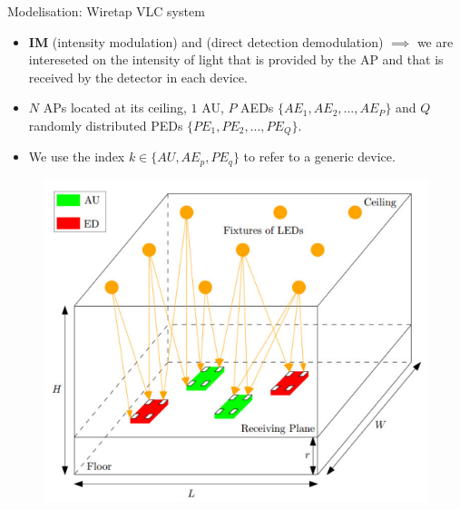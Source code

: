 \documentclass[aspectratio=169,xcolor=dvipsnames]{beamer}
\begin{document}
	\begin{frame}{Modelisation: Wiretap VLC system}
		\begin{itemize}
			\item \textbf{IM} (intensity modulation) and  (direct detection demodulation) $\implies$ we are intereseted on the intensity of light that is provided by the AP and that is received by the detector in each device.
			\item $N$ APs located at its ceiling, $1$ AU, $P$ AEDs $\{ AE_1, AE_2, ..., AE_P \}$ and $Q$ randomly distributed PEDs $\{ PE_1, PE_2, ..., PE_Q \}$.
			\item We use the index $k \in \{AU, AE_p, PE_q\}$ to refer to a generic device.
		\end{itemize}
		\begin{figure}[h!]
			\centering
			\includegraphics[scale=0.4]{../../modelisation.PNG}
		\end{figure}
	\end{frame}
	
\end{document}
